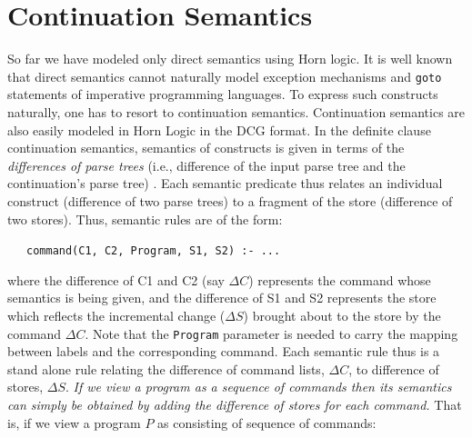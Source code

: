 \documentclass{entcs}
\begin{document}

\section{Continuation Semantics}

So far we have modeled only direct semantics \cite{schmidt} using Horn logic. It is well
known that direct semantics cannot naturally model exception mechanisms
and {\tt goto} statements of imperative programming languages.
To express such constructs naturally, one has to resort to continuation semantics.
Continuation semantics are also easily modeled in Horn Logic in the DCG format.
In the definite clause continuation semantics, semantics
of constructs is given in terms of the {\it differences of parse
trees} (i.e., difference of the input parse tree and the  
continuation's parse tree) \cite{diffsem}. 
Each semantic predicate
thus relates an individual construct (difference of two parse trees) 
to a fragment of the store (difference of two stores).
Thus, semantic rules are of the form:

~~~{\tt command(C1, C2, Program, S1, S2) :- ...}

\noindent where the difference of C1 and C2 (say $\Delta C$) represents
the command whose semantics is being given, and the difference
of S1 and S2 represents the store which reflects the incremental
change ($\Delta S$) brought about to the store by the command $\Delta C$. Note that
the {\tt Program} parameter is needed to carry the mapping between
labels and the corresponding command. Each semantic rule thus is
a stand alone rule relating the difference of command lists, $\Delta C$, to
difference of stores, $\Delta S$.  
{\it If we view a program as a sequence of commands then its semantics
can simply be obtained by adding the difference of stores for each command.}
That is, if we view a program $P$ as consisting of sequence of commands:
\end{document}
